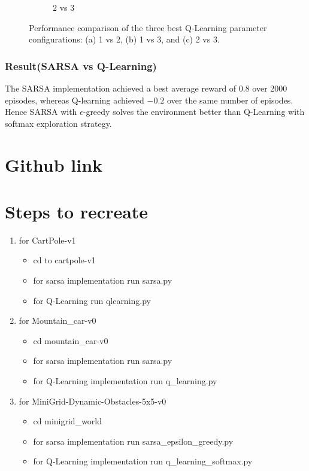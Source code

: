 \documentclass[11pt, a4]{article}
\begin{document}
\begin{figure}[H]
\begin{subfigure}{.7\textwidth}
						\caption{$2$ vs $3$}
						\label{fig:qlearningminigridworld2vs3}
					\end{subfigure}
					\caption{Performance comparison of the three best Q-Learning parameter configurations: (a) 1 vs 2, (b) 1 vs 3, and (c) 2 vs 3.}
					\label{fig:qlearningminigridworld}
				\end{figure}
			\subsubsection{Result(SARSA vs Q-Learning)}
			The SARSA implementation achieved a best average reward of \(0.8\) over 2000 episodes, whereas Q-learning achieved \(-0.2\) over the same number of episodes. Hence SARSA with $\epsilon$-greedy solves the environment better than Q-Learning with softmax exploration strategy.
	\section{Github link}	
		 \href{https://github.com/RitabrataMandal/RL-DA6400-assignment_1}{}
	\section{Steps to recreate}
		\begin{enumerate}
			\item for CartPole-v1 \begin{itemize}
				\item cd to cartpole-v1
				\item for sarsa implementation run sarsa.py
				\item for Q-Learning run qlearning.py
			\end{itemize}
			\item for Mountain\_car-v0 \begin{itemize}
				\item cd mountain\_car-v0
				\item for sarsa implementation run sarsa.py
				\item for Q-Learning implementation run q\_learning.py
			\end{itemize}
			\item for MiniGrid-Dynamic-Obstacles-5x5-v0 \begin{itemize}
				\item cd minigrid\_world
				\item for sarsa implementation run  sarsa\_epsilon\_greedy.py
				\item for Q-Learning implementation run q\_learning\_softmax.py
			\end{itemize}
		\end{enumerate}
		\newpage
		
		
\end{document}
